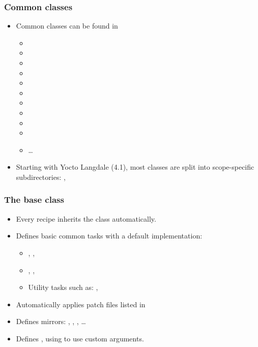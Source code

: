 \begin{frame}
  \frametitle{Common classes}
  \begin{itemize}
    \item Common classes can be found in 
    \begin{itemize}
      \item {}
      \item {}
      \item {}
      \item {}
      \item {}
      \item {}
      \item {}
      \item {}
      \item {}
      \item {}
      \item \dots
    \end{itemize}
  \item Starting with Yocto Langdale (4.1), most classes are split into
    scope-specific subdirectories: ,
  \end{itemize}
\end{frame}

\begin{frame}
  \frametitle{The base class}
  \begin{itemize}
    \item Every recipe inherits the  class automatically.
    \item Defines basic common tasks with a default implementation:
      \begin{itemize}
        \item {}, , 
        \item {}, , 
        \item Utility tasks such as: , 
      \end{itemize}
    \item Automatically applies patch files listed in 
    \item Defines mirrors: ,
      , , \dots
    \item Defines , using  to use
      custom arguments.
  \end{itemize}
\end{frame}

